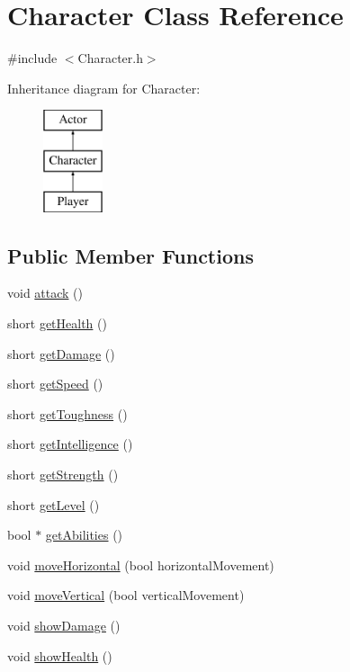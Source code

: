 \hypertarget{class_character}{\section{Character Class Reference}
\label{class_character}
}


{\ttfamily \#include $<$Character.\-h$>$}

Inheritance diagram for Character\-:\begin{figure}[H]
\begin{center}
\leavevmode
\includegraphics[height=3.000000cm]{class_character}
\end{center}
\end{figure}
\subsection*{Public Member Functions}
\begin{DoxyCompactItemize}
\item 
void \hyperlink{class_character_a891042a5f9ba38a4ab98d79e32a590b9}{attack} ()
\item 
short \hyperlink{class_character_a71e26e0edbb4182414827b997bea7be2}{get\-Health} ()
\item 
short \hyperlink{class_character_a6f53d06b8eb41bebb45750676a2f2b3d}{get\-Damage} ()
\item 
short \hyperlink{class_character_a50c26b239e9687ba5b34665a65a11dbe}{get\-Speed} ()
\item 
short \hyperlink{class_character_ad607ba44fdccc8b571f19194cc205dd4}{get\-Toughness} ()
\item 
short \hyperlink{class_character_a79a7ef5e8b1bdca05424fe611fe056b9}{get\-Intelligence} ()
\item 
short \hyperlink{class_character_a56dc21cdc1c460fac9ab013e09a36dd9}{get\-Strength} ()
\item 
short \hyperlink{class_character_a621cb6b6e50c35ce431b914dd300b16b}{get\-Level} ()
\item 
bool $\ast$ \hyperlink{class_character_a00d426ba5c22e935add036831a100bc8}{get\-Abilities} ()
\item 
void \hyperlink{class_character_ade340e0ec4e25b8f86615323f588eb9c}{move\-Horizontal} (bool horizontal\-Movement)
\item 
void \hyperlink{class_character_a9f46f32c23ef47d0454fc6bb00b95294}{move\-Vertical} (bool vertical\-Movement)
\item 
void \hyperlink{class_character_ae6b11b3e6a84287216630ecc355ab8e3}{show\-Damage} ()
\item 
void \hyperlink{class_character_a84a7de8166aa93320511fc4fc4e77b44}{show\-Health} ()
\end{DoxyCompactItemize}
